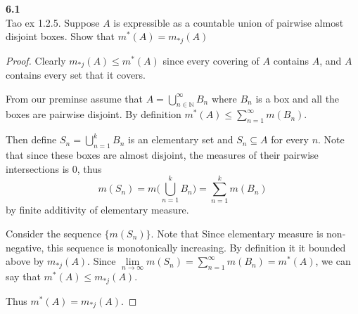 \documentclass[12pt]{article}
\newcommand{\problem}[1]{\hspace{-4 ex} \large \textbf{#1}\\}
\begin{document}
\problem{6.1}Tao ex 1.2.5. Suppose $A$ is expressible as a countable union of pairwise almost disjoint boxes. Show that $m^*(A)=m_{*j}(A)$ 
	\begin{proof}
		Clearly $m_{*j}(A) \leq m^*(A)$ since every covering of $A$ contains $A$, and $A$ contains every set that it covers. \bigbreak
		
		From our preminse assume that $A = \bigcup\limits_{n \in \mathbb{N}}^\infty B_n$ where $B_n$ is a box and all the boxes are pairwise disjoint. By definition $m^*(A) \leq \sum\limits_{n=1}^\infty m(B_n)$. \bigbreak
		
		Then define $S_n = \bigcup\limits_{n=1}^k B_n$ is an elementary set and $S_n \subseteq A$ for every $n$. Note that since these boxes are almost disjoint, the measures of their pairwise intersections is $0$, thus 
		$$m(S_n) = m\Big(\bigcup\limits_{n=1}^k B_n \Big) = \sum\limits_{n=1}^k m(B_n)$$
		by finite additivity of elementary measure.
		
		Consider the sequence $\{m(S_n)\}$. Note that Since elementary measure is non-negative, this sequence is monotonically increasing. By definition it it bounded above by  $m_{*j}(A)$. Since $\lim\limits_{n \to \infty} m(S_n) = \sum\limits_{n=1}^\infty m(B_n) = m^*(A)$, we can say that $m^*(A) \leq m_{*j}(A)$. \bigbreak
		
		Thus $m^*(A)=m_{*j}(A)$.		
	\end{proof}
\end{document}

